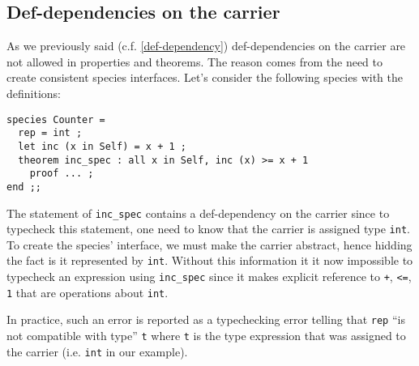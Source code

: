 \subsection{Def-dependencies on the carrier}
\label{def-dep-on-carrier}
As we previously said (c.f. \ref{def-dependency}) def-dependencies on
the carrier are not allowed in properties and theorems. The reason
comes from the need to create consistent species interfaces. Let's
consider the following species with the definitions:
{\scriptsize
\begin{lstlisting}
species Counter =
  rep = int ;
  let inc (x in Self) = x + 1 ;
  theorem inc_spec : all x in Self, inc (x) >= x + 1
    proof ... ;
end ;;
\end{lstlisting}
}

The statement of {\tt inc\_spec} contains a def-dependency on the
carrier since to typecheck this statement, one need to know that the
carrier is assigned type {\tt int}. To create the species' interface,
we must make the carrier abstract, hence hidding the fact is it
represented by {\tt int}. Without this information it it now
impossible to typecheck an expression using {\tt inc\_spec} since it
makes explicit reference to {\tt +}, {\tt <=}, {\tt 1} that are
operations about {\tt int}.

In practice, such an error is reported as a typechecking error telling
that {\tt rep} ``is not compatible with type'' {\tt t} where {\tt t}
is the type expression that was assigned to the carrier (i.e.
{\tt int} in 
our example).
